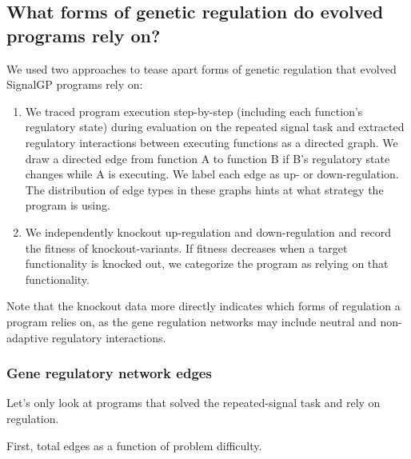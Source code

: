 \documentclass[
]{book}
\providecommand{\tightlist}{%
  \setlength{\itemsep}{0pt}\setlength{\parskip}{0pt}}
\begin{document}
\hypertarget{what-forms-of-genetic-regulation-do-evolved-programs-rely-on}{%
\subsection{What forms of genetic regulation do evolved programs rely on?}\label{what-forms-of-genetic-regulation-do-evolved-programs-rely-on}}

We used two approaches to tease apart forms of genetic regulation that evolved SignalGP programs rely on:

\begin{enumerate}
\def\labelenumi{\arabic{enumi}.}
\tightlist
\item
  We traced program execution step-by-step (including each function's regulatory state) during evaluation on the repeated signal task and extracted regulatory interactions between executing functions as a directed graph.
  We draw a directed edge from function A to function B if B's regulatory state changes while A is executing.
  We label each edge as up- or down-regulation. The distribution of edge types in these graphs hints at what strategy the program is using.
\item
  We independently knockout up-regulation and down-regulation and record the fitness of knockout-variants.
  If fitness decreases when a target functionality is knocked out, we categorize the program as relying on that functionality.
\end{enumerate}

Note that the knockout data more directly indicates which forms of regulation a program relies on,
as the gene regulation networks may include neutral and non-adaptive regulatory interactions.

\hypertarget{gene-regulatory-network-edges}{%
\subsubsection{Gene regulatory network edges}\label{gene-regulatory-network-edges}}

Let's only look at programs that solved the repeated-signal task and rely on regulation.

First, total edges as a function of problem difficulty.
\end{document}
